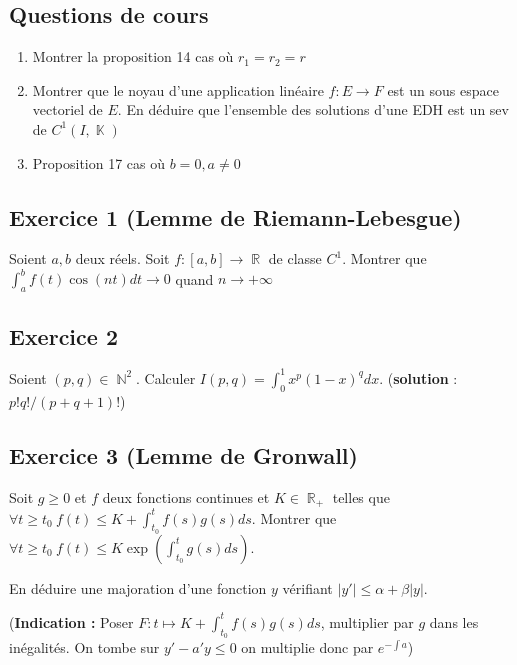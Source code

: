 \documentclass{article}
\DeclareMathOperator{\R}{\mathbb{R}}
\DeclareMathOperator{\N}{\mathbb{N}}
\DeclareMathOperator{\K}{\mathbb{K}}
\begin{document}
\subsection*{Questions de cours}

\begin{enumerate}
   \item Montrer la proposition 14 cas où $r_1 = r_2 = r$ 
    \item Montrer que le noyau d'une application linéaire $f:E\to F$ est un sous espace vectoriel de $E$. En déduire que l'ensemble des solutions d'une EDH est un sev de $C^1(I, \K)$ 
    \item  Proposition 17 cas où $b=0, a \neq 0$ 
\end{enumerate}


\subsection*{Exercice 1 (Lemme de Riemann-Lebesgue)} 

Soient $a, b$ deux réels. Soit $f : [a, b] \to \R$ de classe $C^1$. Montrer que $\displaystyle\int_a^b{f(t)\cos{(nt)}dt} \longrightarrow 0 $ quand $n \rightarrow +\infty$  

\subsection*{Exercice 2} 

Soient $(p,q)\in \N^2$. Calculer $I(p,q) = \displaystyle\int_0^1{x^p(1-x)^qdx}$. (\textbf{solution} : $p!q!/(p+q+1)!$) 

\subsection*{Exercice 3 (Lemme de Gronwall)} 

Soit $g \geqslant 0$ et $f$ deux fonctions continues et $K\in \R_+$ telles que $\forall t\geqslant t_0\ f(t) \leqslant K + \displaystyle\int_{t_0}^t{f(s)g(s)ds}$. Montrer que $\forall t\geqslant t_0 \ f(t) \leqslant K\exp{\left(\displaystyle\int_{t_0}^t{g(s)ds} \right)}$. 

En déduire une majoration d'une fonction $y$ vérifiant $|y'| \leqslant \alpha + \beta |y|$. 

(\textbf{Indication :} Poser $F : t \mapsto K + \displaystyle\int_{t_0}^t{f(s)g(s)ds}$, multiplier par $g$ dans les inégalités. On tombe sur $y' - a'y \leqslant 0$ on multiplie donc par $e^{-\int{a}}$) 
\end{document}
